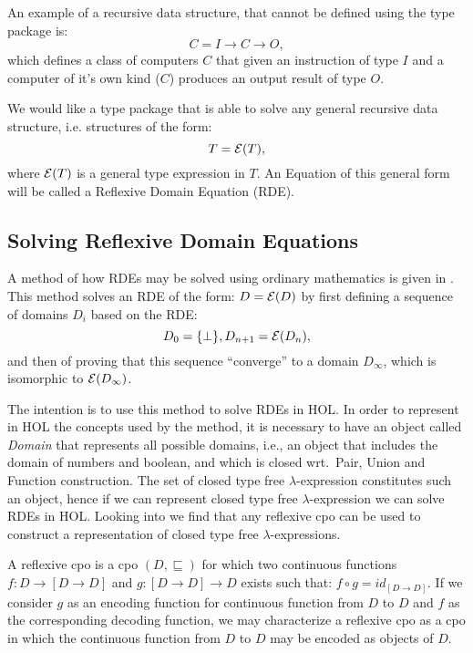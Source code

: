 An example of a recursive data structure, that cannot be defined using
the type package is:
\[C = I \rightarrow C \rightarrow O,
\]
which defines a class of computers \(C\) that given an instruction of type
\(I\) and a computer of it's own kind (\(C\)) produces an output result of type
\(O\).

We would like a type package that is able to solve any general recursive data
structure, i.e. structures of the form:
\[T = {\cal E} (T),
\]
where \({\cal E} (T)\) is a general type expression in \(T\).  An
Equation of this general form will be called a Reflexive Domain
Equation (RDE).


\subsection*{Solving Reflexive Domain Equations}

A method of how RDEs may be solved using ordinary mathematics is given in
\cite{schmidt:d-infinite}.
This method solves an RDE of the form: \(D = {\cal E} (D)\) by first defining
a sequence of domains \(D_i\) based on the RDE:
\[ D_0 = \{\bot\}, D_{n+1} = {\cal E} (D_n),\]
and then of proving that this sequence ``converge'' to a domain \(D_\infty\),
which is isomorphic to \({\cal E}(D_\infty)\).

The intention is to use this method to solve RDEs in HOL.  In order to
represent in HOL the concepts used by the method, it is necessary to have an
object called {\em Domain\/} that represents all possible domains, i.e., an
object that includes the domain of numbers and boolean, and which is closed
wrt.\ Pair, Union and Function construction.  The set of closed type free
\(\lambda\)-expression constitutes such an object, hence if we can represent
closed type free
\(\lambda\)-expression we can solve RDEs in HOL.  Looking into
\cite{barendregt:lambda} we find that any reflexive cpo can be used to
construct a representation of closed type free
\(\lambda\)-expressions.

A reflexive cpo is a cpo \((D, \sqsubseteq)\) for which two continuous
functions \(f: D \rightarrow [D \rightarrow D]\) and \(g: [D \rightarrow D]
\rightarrow D\) exists such that: \(f \circ g = id_{[D \rightarrow D]}\).  If
we consider \(g\) as an encoding function for continuous function from \(D\) to
\(D\) and \(f\) as the corresponding decoding function, we may characterize a
reflexive cpo as a cpo in which the continuous function from \(D\) to \(D\)
may be encoded as objects of \(D\).

